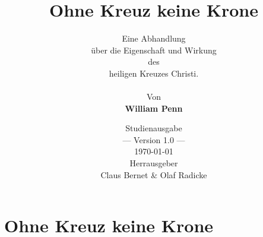 \documentclass[a5paper,pagesize,9pt]{scrbook}
\begin{document}
\author{
Eine Abhandlung \\
über die Eigenschaft und Wirkung
\\
des
\\
heiligen Kreuzes Christi.
\\
\\
Von
\\
\textbf{William Penn}
}

\title{Ohne Kreuz keine Krone}
\date{
Studienausgabe
\\ --- Version 1.0 ---
\\ \today
\bigskip
\\ Herrausgeber
\\Claus Bernet \& Olaf Radicke
}

\maketitle

\frontmatter

\tableofcontents




\mainmatter

\part{Ohne Kreuz keine Krone}


\end{document}

